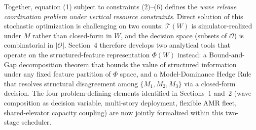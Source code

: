 \documentclass[11pt, a4paper]{article}
\begin{document}
Together, equation (1) subject to constraints (2)--(6) defines the \emph{wave release coordination problem under vertical resource constraints}. Direct solution of this stochastic optimization is challenging on two counts: $\mathcal{T}(W)$ is simulator-realized under $M$ rather than closed-form in $W$, and the decision space (subsets of $\mathcal{O}$) is combinatorial in $|\mathcal{O}|$. Section~4 therefore develops two analytical tools that operate on the structured-feature representation $\Phi(W)$ instead: a Bound-and-Gap decomposition theorem that bounds the value of structured information under any fixed feature partition of $\Phi$ space, and a Model-Dominance Hedge Rule that resolves structural disagreement among $\{M_1, M_2, M_3\}$ via a closed-form decision. The four problem-defining elements identified in Sections~1 and~2 (wave composition as decision variable, multi-story deployment, flexible AMR fleet, shared-elevator capacity coupling) are now jointly formalized within this two-stage scheduler.
\end{document}

